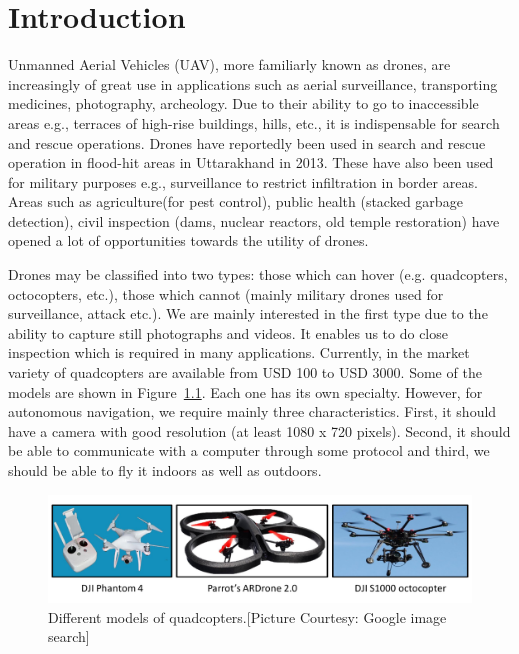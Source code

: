 \chapter{Introduction}
\label{ch:intro}
Unmanned Aerial Vehicles (UAV), more familiarly known as drones, are
increasingly of great use in applications such as aerial
surveillance\cite{dronesurvey1, dronesurvey3}, transporting
medicines\cite{dronedelivery1,dronedelivery2}, photography\cite{dronephoto1,
dronephoto2, dronephoto3}, archeology\cite{dronearchaeology}.
Due to their ability to go to inaccessible areas e.g., terraces of high-rise
buildings, hills, etc., it is indispensable for search and rescue operations.
Drones have reportedly been used in search and rescue operation in flood-hit
areas in Uttarakhand in 2013. These have also been used for military
purposes e.g., surveillance to restrict infiltration in border areas\cite{dronesurvey2}.
Areas such as agriculture(for pest control), public health (stacked garbage
detection), civil inspection (dams, nuclear reactors, old temple restoration) have 
opened a lot of opportunities towards the utility of drones.

Drones may be classified into two types: those which can hover (e.g.
quadcopters, octocopters, etc.), those which cannot (mainly military drones
used for surveillance, attack etc.). We are mainly interested in the first type due
to the ability to capture still photographs and videos. It enables us to do
close inspection which is required in many applications. Currently, in the
market variety of quadcopters are available from USD 100 to USD 3000.
Some of the models are shown in Figure~\ref{fig:quadcopters}.
Each one has its own specialty. However, for autonomous navigation, we require mainly
three characteristics. First, it should have a camera with good resolution (at
least 1080 x 720 pixels). Second, it should be able to communicate with a
computer through some protocol and third, we should be able to fly it indoors as
well as outdoors.

\begin{figure}[h!]
\centering
\includegraphics[width=0.98\linewidth]{figures/quadcopters}
\caption[Different models of quadcopters]{Different models of
quadcopters.[Picture Courtesy: Google image search]}
\label{fig:quadcopters}
\end{figure}

